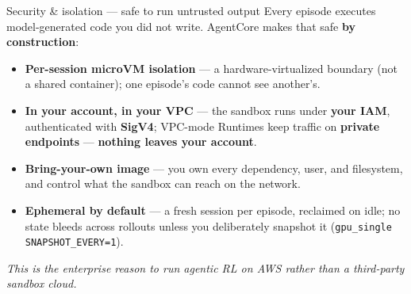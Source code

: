 \documentclass[
  10pt,
  ignorenonframetext,
  aspectratio=169,
  t]{beamer}
\providecommand{\tightlist}{%
  \setlength{\itemsep}{0pt}\setlength{\parskip}{0pt}}
\begin{document}
\begin{frame}{Security \& isolation --- safe to run untrusted
output}
\protect\hypertarget{security-isolation-safe-to-run-untrusted-output}{}
Every episode executes model-generated code you did not write. AgentCore
makes that safe \textbf{by construction}:

\begin{itemize}
\tightlist
\item
  \textbf{Per-session microVM isolation} --- a hardware-virtualized
  boundary (not a shared container); one episode's code cannot see
  another's.
\item
  \textbf{In your account, in your VPC} --- the sandbox runs under
  \textbf{your IAM}, authenticated with \textbf{SigV4}; VPC-mode
  Runtimes keep traffic on \textbf{private endpoints} ---
  \textbf{nothing leaves your account}.
\item
  \textbf{Bring-your-own image} --- you own every dependency, user, and
  filesystem, and control what the sandbox can reach on the network.
\item
  \textbf{Ephemeral by default} --- a fresh session per episode,
  reclaimed on idle; no state bleeds across rollouts unless you
  deliberately snapshot it (\texttt{gpu\_single}
  \texttt{SNAPSHOT\_EVERY=1}).
\end{itemize}

\emph{This is the enterprise reason to run agentic RL on AWS rather than
a third-party sandbox cloud.}
\end{frame}
\end{document}

